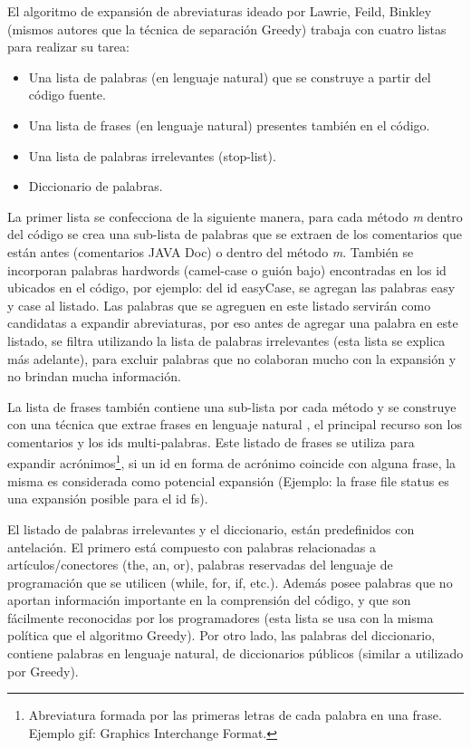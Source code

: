 El algoritmo de expansión de abreviaturas ideado por Lawrie, Feild, Binkley (mismos autores que la técnica de separación Greedy) \cite{LFBEX07} trabaja con cuatro listas para realizar su tarea:

\begin{itemize}
\itemsep0em%
\item Una lista de palabras (en lenguaje natural) que se construye a partir del código fuente.
\item Una lista de frases (en lenguaje natural) presentes también en el código.
\item Una lista de palabras irrelevantes (stop-list).
\item Diccionario de palabras.
\end{itemize}


La primer lista se confecciona de la siguiente manera, para cada método \textit{m} dentro del código se crea una sub-lista de palabras que se extraen de los comentarios que están antes (comentarios JAVA Doc) o dentro del método \textit{m}. También se incorporan palabras hardwords (camel-case o guión bajo) encontradas en los id ubicados en el código, por ejemplo: del id \textsf{easyCase}, se agregan las palabras \textsf{easy} y \textsf{case} al listado. Las palabras que se agreguen en este listado servirán como candidatas a expandir abreviaturas, por eso antes de agregar una palabra en este listado, se filtra utilizando la lista de palabras irrelevantes (esta lista se explica más adelante), para excluir palabras que no colaboran mucho con la expansión y no brindan mucha información.

La lista de frases también contiene una sub-lista por cada método y se construye con una técnica que extrae frases en lenguaje natural \cite{FFCW01}, el principal recurso son los comentarios y los ids multi-palabras. Este listado de frases se utiliza para expandir acrónimos\footnote[1]{Abreviatura formada por las primeras letras de cada palabra en una frase. Ejemplo gif: Graphics Interchange Format.}, si un id en forma de acrónimo coincide con alguna frase, la misma es considerada como potencial expansión \cite{LOPT00} (Ejemplo: la frase \textsf{file status} es una expansión posible para el id \textsf{fs}).

El listado de palabras irrelevantes y el diccionario, están predefinidos con antelación. El primero está compuesto con palabras relacionadas a artículos/conectores (the, an, or), palabras reservadas del lenguaje de programación que se utilicen (\textsf{while, for, if,} etc.). Además posee palabras que no aportan información importante en la comprensión del código, y que son fácilmente reconocidas por los programadores (esta lista se usa con la misma política que el algoritmo Greedy). Por otro lado, las palabras del diccionario, contiene palabras en lenguaje natural, de diccionarios públicos (similar a utilizado por Greedy).

